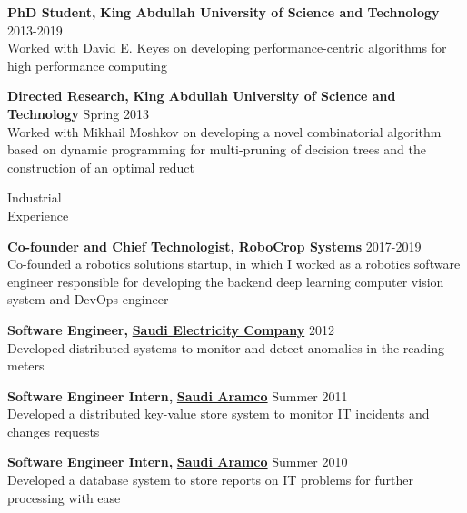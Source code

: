 \documentclass[10pt,a4paper]{article}
\begin{document}
\begin{cv}
\begin{cvlist}{}
\vspace{+2mm}
{\bf PhD Student,}
{\bf King Abdullah University of Science and Technology} \hfill 2013-2019\\
Worked with David E. Keyes on developing performance-centric algorithms for
high performance computing

\vspace{+2mm}
{\bf Directed Research,}
{\bf King Abdullah University of Science and Technology} \hfill Spring 2013\\
Worked with Mikhail Moshkov on developing a novel combinatorial algorithm
based on dynamic programming for multi-pruning of decision trees
and the construction of an optimal reduct


\vspace{+2mm}
\item[{\parbox[t][0pt][t]{1in}{{\sc Industrial}\\ {\sc Experience}}}]
{\bf Co-founder and Chief Technologist,}
{\bf RoboCrop Systems} \hfill 2017-2019\\
Co-founded a robotics solutions startup, in which I worked as a robotics
software engineer responsible for developing the backend deep learning
computer vision system and DevOps engineer

\vspace{+2mm}
{\bf Software Engineer,}
{\href{https://www.se.com.sa/en-us/Pages/home.aspx}
{\bf Saudi Electricity Company}} \hfill 2012\\
Developed distributed systems
to monitor and detect anomalies in the reading meters

\vspace{+2mm}
{\bf Software Engineer Intern,}
{\href{https://www.saudiaramco.com/}
{\bf Saudi Aramco}} \hfill Summer 2011\\
Developed a distributed key-value store system to monitor
IT incidents and changes requests

\vspace{+2mm}
{\bf Software Engineer Intern,}
{\href{https://www.saudiaramco.com/}
{\bf Saudi Aramco}} \hfill Summer 2010\\
Developed a database system to store reports on IT
problems for further processing with ease



\end{cvlist}
\end{cv}
\end{document}
